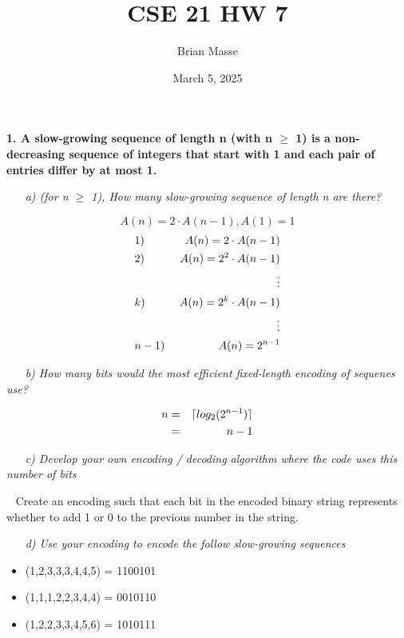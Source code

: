 \documentclass[12pt, letterpaper]{article}
\title{CSE 21 HW 7}
\author{Brian Masse}
\date{March 5, 2025}
\DeclarePairedDelimiter{\ceil}{\lceil}{\rceil}
\begin{document}
\maketitle
\newpage


\bf{ 1. A slow-growing sequence of length n (with n \(\ge\) 1) is a non-decreasing sequence of integers that start with 1 and each pair of entries differ by at most 1. }

\-\ \newline
\-\ \it{ a) (for n \(\ge\) 1), How many slow-growing sequence of length n are there? }

\[A(n) = 2 \cdot A(n - 1), A(1) = 1\]
\begin{eqnarray*}
&1)& \textnormal{ } A(n) = 2 \cdot A(n - 1) \\
&2)& \textnormal{ } A(n) = 2^2 \cdot A(n - 1) \\
&\textnormal{  }& \vdots \\
&k)& \textnormal{ } A(n) = 2^k \cdot A(n - 1) \\
&\textnormal{  }& \vdots \\
&n - 1)& \textnormal{ } A(n) = 2^{n - 1} \\
\end{eqnarray*}

\-\ \newline
\-\ \it{ b) How many bits would the most efficient fixed-length encoding of sequenes use? }


\begin{eqnarray*}
n &=& \ceil{ log_2( 2^{n - 1}) } \\
&=& n - 1
\end{eqnarray*}



\-\ \newline
\-\ \it{ c) Develop your own encoding / decoding algorithm where the code uses this number of bits }

\-\ \newline
\textnormal{ Create an encoding such that each bit in the encoded binary string represents whether to add 1 or 0 to the previous number in the string. }


\-\ \newline
\-\ \it{ d) Use your encoding to encode the follow slow-growing sequences }
\-\ \newline
\begin{itemize}
\item (1,2,3,3,3,4,4,5)
\textnormal{ = 1100101}

\item (1,1,1,2,2,3,4,4)
\textnormal{ = 0010110}

\item (1,2,2,3,3,4,5,6)
\textnormal{ = 1010111}
\end{itemize}
\end{document}
